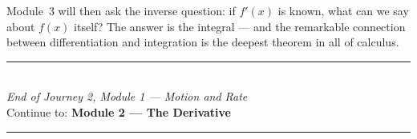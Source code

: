\documentclass[12pt, a4paper]{article}
\begin{document}
Module~3 will then ask the inverse question: if $f'(x)$ is known, what can we say about $f(x)$ itself? The answer is the integral --- and the remarkable connection between differentiation and integration is the deepest theorem in all of calculus.

\vspace{1.4cm}
\begin{center}
{\color{MidBlue}\rule{0.5\linewidth}{0.8pt}}\\[6pt]
{\small\color{DarkGrey}\textit{End of Journey 2, Module 1 --- Motion and Rate}}\\[4pt]
{\small\color{DarkGrey}Continue to: \textbf{Module 2 --- The Derivative}}\\[6pt]
{\color{MidBlue}\rule{0.5\linewidth}{0.8pt}}
\end{center}
\end{document}
